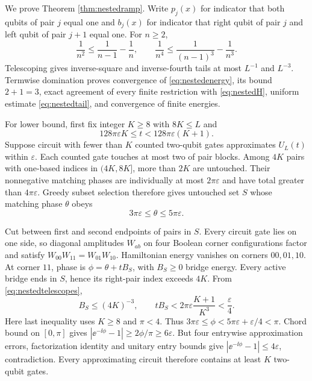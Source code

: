 We prove Theorem \ref{thm:nestedramp}.  Write $p_j(x)$ for indicator that
both qubits of pair $j$ equal one and $b_j(x)$ for indicator that right qubit
of pair $j$ and left qubit of pair $j+1$ equal one.  For $n\ge2$,
\begin{equation}
 \frac1{n^2}\le\frac1{n-1}-\frac1n,
 \qquad
 \frac1{n^4}\le\frac1{(n-1)^3}-\frac1{n^3}.          \label{eq:nestedtelescopes}
\end{equation}
Telescoping gives inverse-square and inverse-fourth tails at most $L^{-1}$
and $L^{-3}$.  Termwise domination proves convergence of
\eqref{eq:nestedenergy}, its bound $2+1=3$, exact agreement of every finite
restriction with \eqref{eq:nestedH}, uniform estimate
\eqref{eq:nestedtail}, and convergence of finite energies.

For lower bound, first fix integer $K\ge8$ with $8K\le L$ and
\begin{equation}
 128\pi\varepsilon K\le t
 <128\pi\varepsilon(K+1).                            \label{eq:nestedKwindow}
\end{equation}
Suppose circuit with fewer than $K$ counted two-qubit gates approximates
$U_L(t)$ within $\varepsilon$.  Each counted gate touches at most two of
pair blocks.  Among $4K$ pairs with one-based indices in $(4K,8K]$, more
than $2K$ are untouched.  Their nonnegative matching phases are individually
at most $2\pi\varepsilon$ and have total greater than
$4\pi\varepsilon$.  Greedy subset selection therefore gives untouched set
$S$ whose matching phase $\theta$ obeys
\begin{equation}
 3\pi\varepsilon\le\theta\le5\pi\varepsilon.         \label{eq:nestedtheta}
\end{equation}

Cut between first and second endpoints of pairs in $S$.  Every circuit gate
lies on one side, so diagonal amplitudes $W_{ab}$ on four Boolean corner
configurations factor and satisfy $W_{00}W_{11}=W_{01}W_{10}$.  Hamiltonian
energy vanishes on corners $00,01,10$.  At corner $11$, phase is
$\phi=\theta+tB_S$, with $B_S\ge0$ bridge energy.  Every active bridge ends
in $S$, hence its right-pair index exceeds $4K$.  From
\eqref{eq:nestedtelescopes},
\begin{equation}
 B_S\le(4K)^{-3},\qquad
 tB_S<2\pi\varepsilon\frac{K+1}{K^3}<\frac\varepsilon4.\label{eq:nestedbridge}
\end{equation}
Here last inequality uses $K\ge8$ and $\pi<4$.  Thus
$3\pi\varepsilon\le\phi<5\pi\varepsilon+\varepsilon/4<\pi$.
Chord bound on $[0,\pi]$ gives
$|\ee^{-\ii\phi}-1|\ge2\phi/\pi\ge6\varepsilon$.
But four entrywise approximation errors, factorization identity and unitary
entry bounds give $|\ee^{-\ii\phi}-1|\le4\varepsilon$, contradiction.  Every
approximating circuit therefore contains at least $K$ two-qubit gates.

